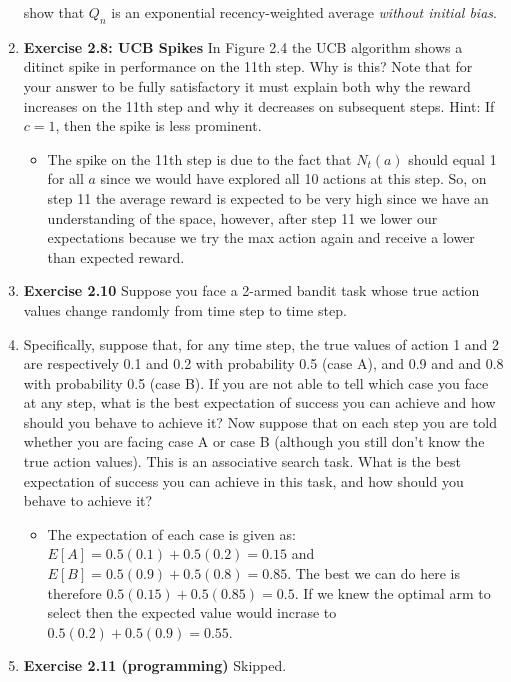 \documentclass[12pt]{article}
\begin{document}
\begin{enumerate}[label=(\alph*)]
  show that $Q_n$ is an exponential recency-weighted average \textit{without initial bias}.
  \item \textbf{Exercise 2.8: UCB Spikes} In Figure 2.4 the UCB algorithm shows a ditinct spike in performance on the 11th step. Why is this? Note
  that for your answer to be fully satisfactory it must explain both why the reward increases on the 11th step and why it decreases on subsequent
  steps. Hint: If $c = 1$, then the spike is less prominent. 
  \begin{itemize}
    \item The spike on the 11th step is due to the fact that $N_t(a)$ should equal 1 for all $a$ since we would have explored all 10 actions
    at this step. So, on step 11 the average reward is expected to be very high since we have an understanding of the space, however, after 
    step 11 we lower our expectations because we try the max action again and receive a lower than expected reward.
  \end{itemize}
  \item \textbf{Exercise 2.10} Suppose you face a 2-armed bandit task whose true action values change randomly from time step to time step.
  \item Specifically, suppose that, for any time step, the true values of action 1 and 2 are respectively 0.1 and 0.2 with probability 0.5
  (case A), and 0.9 and and 0.8 with probability 0.5 (case B). If you are not able to tell which case you face at any step, what is the best
  expectation of success you can achieve and how should you behave to achieve it? Now suppose that on each step you are told whether you are
  facing case A or case B (although you still don't know the true action values). This is an associative search task. What is the best
  expectation of success you can achieve in this task, and how should you behave to achieve it?
  \begin{itemize}
    \item The expectation of each case is given as: $E[A] = 0.5(0.1) + 0.5(0.2) = 0.15$ and $E[B] = 0.5(0.9) + 0.5(0.8) = 0.85$. The best
    we can do here is therefore $0.5(0.15) + 0.5(0.85) = 0.5$. If we knew the optimal arm to select then the expected value would incrase to 
    $0.5(0.2) + 0.5(0.9) = 0.55$.
  \end{itemize}
  \item \textbf{Exercise 2.11 (programming)} Skipped.
  

\end{enumerate}
\end{document}
